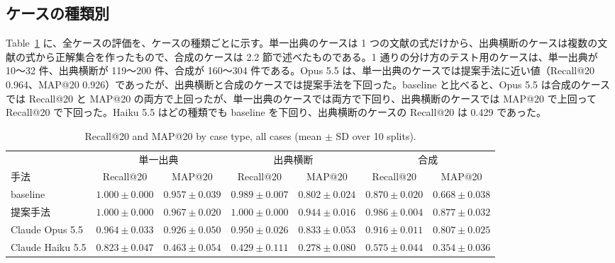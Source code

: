 \documentclass[a4j,dvipdfmx,10pt]{jresume}
\begin{document}
\subsection{ケースの種類別}
Table~\ref{tab:kind} に、全ケースの評価を、ケースの種類ごとに示す。単一出典のケースは 1 つの文献の式だけから、出典横断のケースは複数の文献の式から正解集合を作ったもので、合成のケースは 2.2 節で述べたものである。1 通りの分け方のテスト用のケースは、単一出典が 10〜32 件、出典横断が 119〜200 件、合成が 160〜304 件である。Opus 5.5 は、単一出典のケースでは提案手法に近い値（Recall@20 0.964、MAP@20 0.926）であったが、出典横断と合成のケースでは提案手法を下回った。baseline と比べると、Opus 5.5 は合成のケースでは Recall@20 と MAP@20 の両方で上回ったが、単一出典のケースでは両方で下回り、出典横断のケースでは MAP@20 で上回って Recall@20 で下回った。Haiku 5.5 はどの種類でも baseline を下回り、出典横断のケースの Recall@20 は 0.429 であった。

\begin{table}[t]\centering
\footnotesize
\caption{Recall@20 and MAP@20 by case type, all cases (mean $\pm$ SD over 10 splits).}
\label{tab:kind}
\setlength{\tabcolsep}{4pt}
\begin{tabular}{@{}lcccccc@{}}
\toprule
 & \multicolumn{2}{c}{単一出典} & \multicolumn{2}{c}{出典横断} & \multicolumn{2}{c}{合成} \\
\cmidrule(lr){2-3}\cmidrule(lr){4-5}\cmidrule(l){6-7}
手法 & Recall@20 & MAP@20 & Recall@20 & MAP@20 & Recall@20 & MAP@20 \\
\midrule
baseline & $1.000 \pm 0.000$ & $0.957 \pm 0.039$ & $0.989 \pm 0.007$ & $0.802 \pm 0.024$ & $0.870 \pm 0.020$ & $0.668 \pm 0.038$ \\
提案手法 & $1.000 \pm 0.000$ & $0.967 \pm 0.020$ & $1.000 \pm 0.000$ & $0.944 \pm 0.016$ & $0.986 \pm 0.004$ & $0.877 \pm 0.032$ \\
Claude Opus 5.5 & $0.964 \pm 0.033$ & $0.926 \pm 0.050$ & $0.950 \pm 0.026$ & $0.833 \pm 0.053$ & $0.916 \pm 0.011$ & $0.807 \pm 0.025$ \\
Claude Haiku 5.5 & $0.823 \pm 0.047$ & $0.463 \pm 0.054$ & $0.429 \pm 0.111$ & $0.278 \pm 0.080$ & $0.575 \pm 0.044$ & $0.354 \pm 0.036$ \\
\bottomrule
\end{tabular}
\end{table}
\end{document}
